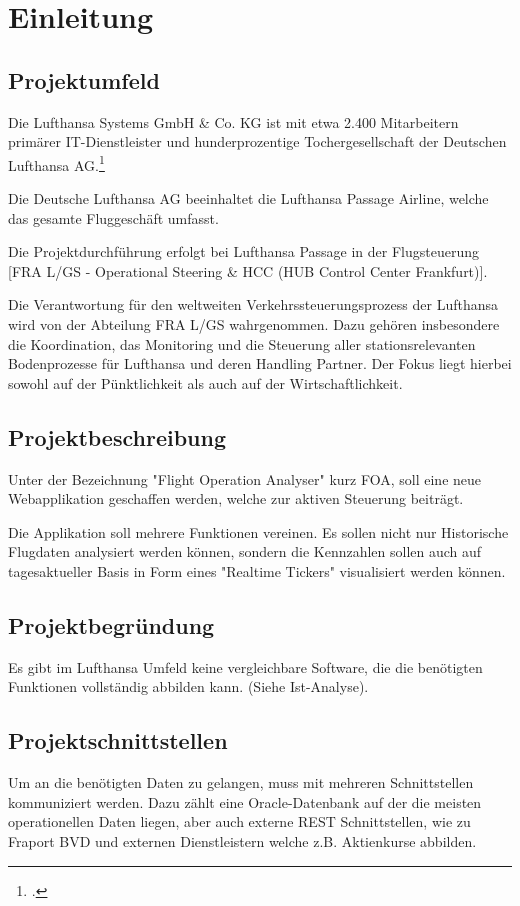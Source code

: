 \section{Einleitung}

	\subsection{Projektumfeld}

	Die Lufthansa Systems GmbH \& Co. KG ist mit etwa 2.400 Mitarbeitern primärer IT-Dienstleister und hunderprozentige Tochergesellschaft der Deutschen Lufthansa AG.\footcite{1}
		
	Die Deutsche Lufthansa AG beeinhaltet die Lufthansa Passage Airline, welche das gesamte Fluggeschäft umfasst.

	Die Projektdurchführung erfolgt bei Lufthansa Passage in der Flugsteuerung [FRA L/GS - Operational Steering \& \gls{HCC} (HUB Control Center Frankfurt)].

	Die Verantwortung für den weltweiten Verkehrssteuerungsprozess der Lufthansa wird von der
	Abteilung FRA L/GS wahrgenommen. Dazu gehören insbesondere die Koordination, das
	Monitoring und die Steuerung aller stationsrelevanten Bodenprozesse für Lufthansa und deren
	Handling Partner. Der Fokus liegt hierbei sowohl auf der Pünktlichkeit als auch auf der
	Wirtschaftlichkeit.


	\subsection{Projektbeschreibung}
	Unter der Bezeichnung "Flight Operation Analyser" kurz FOA, soll eine neue Webapplikation geschaffen werden, welche zur aktiven Steuerung beiträgt.

	Die Applikation soll mehrere Funktionen vereinen. Es sollen nicht nur Historische Flugdaten analysiert werden können, sondern die Kennzahlen sollen auch auf tagesaktueller Basis in Form eines "Realtime Tickers" visualisiert werden können.


	\subsection{Projektbegründung}
	Es gibt im Lufthansa Umfeld keine vergleichbare Software, die die benötigten Funktionen vollständig abbilden kann. (Siehe Ist-Analyse).



	\subsection{Projektschnittstellen}
	Um an die benötigten Daten zu gelangen, muss mit mehreren Schnittstellen kommuniziert werden. Dazu zählt eine Oracle-Datenbank auf der die meisten operationellen Daten liegen, aber auch externe \gls{REST} Schnittstellen, wie zu Fraport \gls{BVD} und externen Dienstleistern welche z.B. Aktienkurse abbilden.
